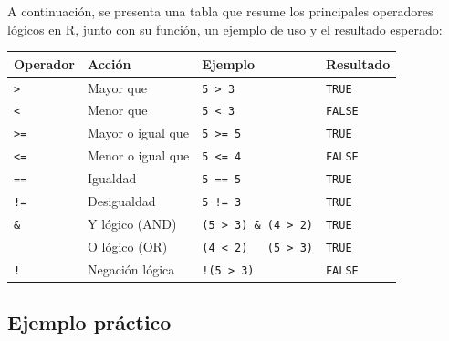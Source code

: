 \documentclass[
  spanish,
  a4paper,
  DIV=11,
  numbers=noendperiod,
  onepage,
  openany]{scrreprt}
\begin{document}
A continuación, se presenta una tabla que resume los principales
operadores lógicos en R, junto con su función, un ejemplo de uso y el
resultado esperado:

\begin{longtable}[]{@{}
  >{\raggedright\arraybackslash}p{}
  >{\raggedright\arraybackslash}p{}
  >{\raggedright\arraybackslash}p{}
  >{\raggedright\arraybackslash}p{}@{}}
\toprule\noalign{}
\begin{minipage}[b]{\linewidth}\raggedright
\textbf{Operador}
\end{minipage} & \begin{minipage}[b]{\linewidth}\raggedright
\textbf{Acción}
\end{minipage} & \begin{minipage}[b]{\linewidth}\raggedright
\textbf{Ejemplo}
\end{minipage} & \begin{minipage}[b]{\linewidth}\raggedright
\textbf{Resultado}
\end{minipage} \\
\midrule\noalign{}
\endhead
\bottomrule\noalign{}
\endlastfoot
\texttt{\textgreater{}} & Mayor que & \texttt{5\ \textgreater{}\ 3} &
\texttt{TRUE} \\
\texttt{\textless{}} & Menor que & \texttt{5\ \textless{}\ 3} &
\texttt{FALSE} \\
\texttt{\textgreater{}=} & Mayor o igual que &
\texttt{5\ \textgreater{}=\ 5} & \texttt{TRUE} \\
\texttt{\textless{}=} & Menor o igual que & \texttt{5\ \textless{}=\ 4}
& \texttt{FALSE} \\
\texttt{==} & Igualdad & \texttt{5\ ==\ 5} & \texttt{TRUE} \\
\texttt{!=} & Desigualdad & \texttt{5\ !=\ 3} & \texttt{TRUE} \\
\texttt{\&} & Y lógico (AND) &
\texttt{(5\ \textgreater{}\ 3)\ \&\ (4\ \textgreater{}\ 2)} &
\texttt{TRUE} \\
\texttt{\textbar{}} & O lógico (OR) &
\texttt{(4\ \textless{}\ 2)\ \ \textbar{}\ (5\ \textgreater{}\ 3)} &
\texttt{TRUE} \\
\texttt{!} & Negación lógica & \texttt{!(5\ \textgreater{}\ 3)} &
\texttt{FALSE} \\
\end{longtable}

\subsection{Ejemplo práctico}\label{ejemplo-pruxe1ctico-1}
\end{document}
